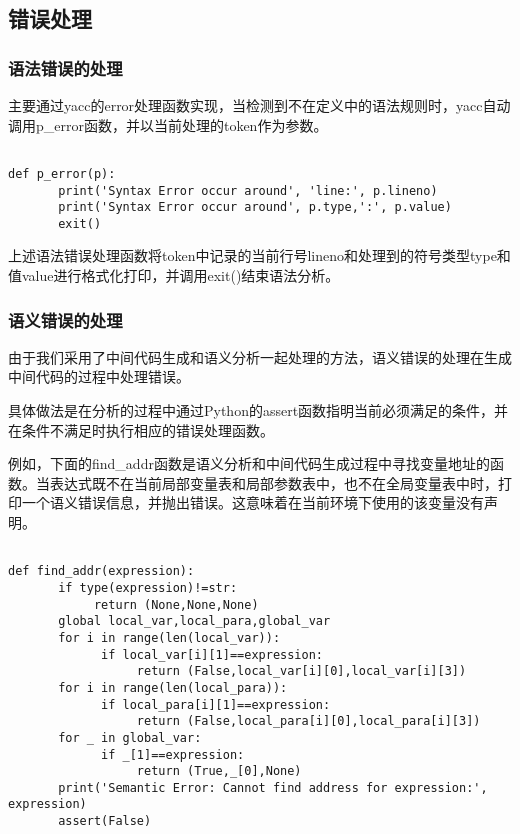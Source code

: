 \documentclass{article}
\begin{document}
\subsection{错误处理}

\subsubsection{语法错误的处理}


主要通过yacc的error处理函数实现，当检测到不在定义中的语法规则时，yacc自动调用p\_error函数，并以当前处理的token作为参数。

\begin{verbatim}

def p_error(p):
       print('Syntax Error occur around', 'line:', p.lineno)
       print('Syntax Error occur around', p.type,':', p.value)
       exit()

\end{verbatim}

上述语法错误处理函数将token中记录的当前行号lineno和处理到的符号类型type和值value进行格式化打印，并调用exit()结束语法分析。

\subsubsection{语义错误的处理}

由于我们采用了中间代码生成和语义分析一起处理的方法，语义错误的处理在生成中间代码的过程中处理错误。

具体做法是在分析的过程中通过Python的assert函数指明当前必须满足的条件，并在条件不满足时执行相应的错误处理函数。

例如，下面的find\_addr函数是语义分析和中间代码生成过程中寻找变量地址的函数。当表达式既不在当前局部变量表和局部参数表中，也不在全局变量表中时，打印一个语义错误信息，并抛出错误。这意味着在当前环境下使用的该变量没有声明。

\begin{verbatim}

def find_addr(expression):
       if type(expression)!=str:
            return (None,None,None)
       global local_var,local_para,global_var
       for i in range(len(local_var)):
             if local_var[i][1]==expression:
                  return (False,local_var[i][0],local_var[i][3])
       for i in range(len(local_para)):
             if local_para[i][1]==expression:
                  return (False,local_para[i][0],local_para[i][3])
       for _ in global_var:
             if _[1]==expression:
                  return (True,_[0],None) 
       print('Semantic Error: Cannot find address for expression:', expression)
       assert(False)

\end{verbatim}
\end{document}
